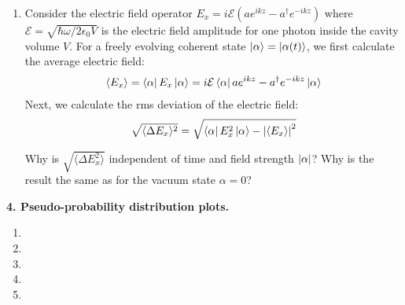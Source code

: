 \documentclass{article}
\theoremstyle{definition}
\newcommand{\al}{\alpha}
\newcommand{\lp}{\left(}
\newcommand{\rp}{\right)}
\begin{document}
\begin{enumerate}[label=\alph*)]
	
		
	\item Consider the electric field operator $E_x = i\mathcal{E}\lp ae^{ikz} - a^\dagger e^{-ikz} \rp$ where $\mathcal{E} = \sqrt{\hbar\omega/2\epsilon_0V}$ is the electric field amplitude for one photon inside the cavity volume $V$. For a freely evolving coherent state $\ket{\al} = \ket{\al(t)}$, we first calculate the average electric field:
	\begin{align*}
		\langle E_x \rangle = \bra{\al} E_x \ket{\al}  = i\mathcal{E} \bra{\al}  ae^{ikz} - a^\dagger e^{-ikz}   \ket{\al}
	\end{align*}
	Next, we calculate the rms deviation of the electric field:
	\begin{align*}
		\sqrt{\langle \Delta E_x \rangle^2} = \sqrt{\bra{\al} E_x^2 \ket{\al} - \abs{\langle E_x \rangle}^2}
	\end{align*}

	Why is $\sqrt{\langle \Delta E_x^2\rangle} $ independent of time and field strength $\abs{\al}$? Why is the result the same as for the vacuum state $\al = 0$?
\end{enumerate}




\noindent \textbf{4. Pseudo-probability distribution plots.}

\begin{enumerate}[label=\alph*)]
	\item 
	
	\item 
	
	\item 
	
	\item 
	
	\item 
\end{enumerate}
\end{document}
